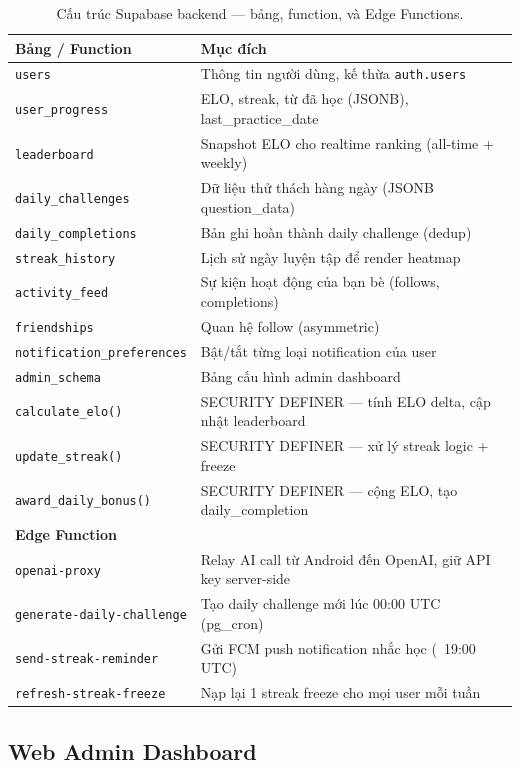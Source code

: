 \documentclass[12pt,a4paper]{article}
\begin{document}
\begin{table}[H]
\centering
\begin{tabular}{@{}p{4cm}p{9cm}@{}}
\toprule
\textbf{Bảng / Function} & \textbf{Mục đích} \\
\midrule
\texttt{users} & Thông tin người dùng, kế thừa \texttt{auth.users} \\
\texttt{user\_progress} & ELO, streak, từ đã học (JSONB), last\_practice\_date \\
\texttt{leaderboard} & Snapshot ELO cho realtime ranking (all-time + weekly) \\
\texttt{daily\_challenges} & Dữ liệu thử thách hàng ngày (JSONB question\_data) \\
\texttt{daily\_completions} & Bản ghi hoàn thành daily challenge (dedup) \\
\texttt{streak\_history} & Lịch sử ngày luyện tập để render heatmap \\
\texttt{activity\_feed} & Sự kiện hoạt động của bạn bè (follows, completions) \\
\texttt{friendships} & Quan hệ follow (asymmetric) \\
\texttt{notification\_preferences} & Bật/tắt từng loại notification của user \\
\texttt{admin\_schema} & Bảng cấu hình admin dashboard \\
\midrule
\texttt{calculate\_elo()} & SECURITY DEFINER — tính ELO delta, cập nhật leaderboard \\
\texttt{update\_streak()} & SECURITY DEFINER — xử lý streak logic + freeze \\
\texttt{award\_daily\_bonus()} & SECURITY DEFINER — cộng ELO, tạo daily\_completion \\
\midrule
\textbf{Edge Function} & \\
\texttt{openai-proxy} & Relay AI call từ Android đến OpenAI, giữ API key server-side \\
\texttt{generate-daily-challenge} & Tạo daily challenge mới lúc 00:00 UTC (pg\_cron) \\
\texttt{send-streak-reminder} & Gửi FCM push notification nhắc học (~19:00 UTC) \\
\texttt{refresh-streak-freeze} & Nạp lại 1 streak freeze cho mọi user mỗi tuần \\
\bottomrule
\end{tabular}
\caption{Cấu trúc Supabase backend — bảng, function, và Edge Functions.}
\end{table}

\subsection{Web Admin Dashboard}
\end{document}
